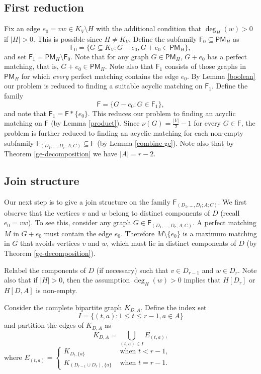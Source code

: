 \documentclass[10pt]{amsart}
\theoremstyle{definition}
\begin{document}
	\subsection*{First reduction}
	Fix an edge $e_0 = vw \in K_V\setminus H$ with the additional condition that $\deg_H(w)>0$ if $|H|>0$. This is possible since $H\neq K_V$.
	Define the subfamily $\mathsf{F}_0\subseteq \mathsf{PM}_H$ as
	\[\mathsf{F}_0 = \{G\subseteq K_V : G-e_0, G+e_0 \in \mathsf{PM}_H\},\]
	and set $\mathsf{F}_1 = \mathsf{PM}_H \setminus \mathsf{F}_0$. Note that for any graph $G\in \mathsf{PM}_H$, $G+e_0$ has a perfect matching, that is, $G+e_0 \in \mathsf{PM}_H$.	Note also that  $\mathsf{F}_1$ consists of those graphs in $\mathsf{PM}_H$ for which {\em every} perfect matching contains the edge $e_0$. 
	By Lemma \ref{boolean}
	our problem is reduced to finding a suitable acyclic matching on $\mathsf{F}_1$. Define the family \[\mathsf{F} = \{G-e_0 : G\in \mathsf{F}_1\},\] and note that $\mathsf{F}_1 = \mathsf{F} * \{e_0\}$. This reduces our problem to finding an acyclic matching on $\mathsf{F}$ (by Lemma \ref{product}). Since $\nu(G) = \frac{|V|}{2}-1$ for every $G\in \mathsf{F}$, the problem is further reduced to finding an acyclic matching for each non-empty subfamily $\mathsf{F}_{(D_1, \dots, D_r; A; C)}\subseteq \mathsf{F}$ (by Lemma \ref{combine-ge}). Note also that by Theorem \ref{ge-decomposition} we have $|A| = r-2$.
	
	
	\subsection*{Join structure}
	Our next step is to give a join structure on the family $\mathsf{F}_{(D_1, \dots, D_r; A; C)}$. 
	We first observe that the vertices $v$ and $w$  belong to distinct components of $D$ (recall $e_0 = vw$). To see this, consider any graph $G\in \mathsf{F}_{(D_1, \dots, D_r; A; C)}$. A perfect matching $M$ in $G+e_0$ must contain the edge $e_0$. Therefore $M\setminus \{e_0\}$ is a maximum matching in $G$ that avoids vertices $v$ and $w$, which must lie in distinct components of $D$ (by Theorem \ref{ge-decomposition}). 
	
	Relabel the components of $D$ (if necessary) such that $v\in D_{r-1}$ and $w\in D_r$. Note also that if $|H|>0$, then the assumption $\deg_H(w)>0$ implies that $H[D_r]$ or $H[D,A]$ is non-empty. 
	
	Consider the complete bipartite graph $K_{D,A}$. Define the index set 
	\[I = \{(t, a) : 1\leq t\leq r-1, a\in A\}\]
	and partition the edges of $K_{D,A}$ as 
	\[K_{D,A} = \textstyle{\bigcup}_{(t,a)\in I} E_{(t,a)} ,\]
	where 
	$E_{(t,a)} = 
	\begin{cases}
	K_{D_t, \{a\}}& \text{ when } t<r-1,\\
	K_{(D_{r-1}\cup D_r), \{a\}} & \text{ when } t=r-1.
	\end{cases}$
	
\end{document}
